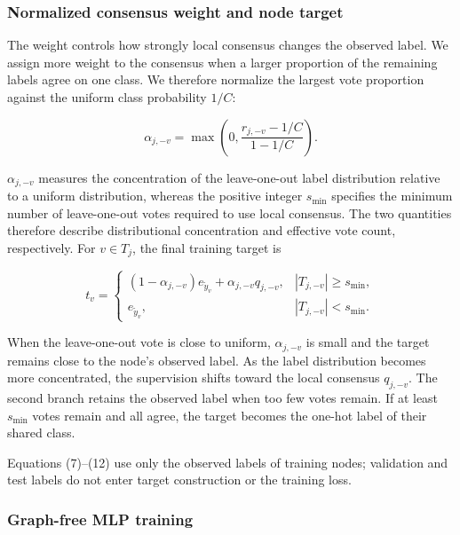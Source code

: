 \documentclass[preprint,12pt]{elsarticle}
\begin{document}
\subsubsection{Normalized consensus weight and node target}\label{sec:3.4.2}

The weight controls how strongly local consensus changes the observed label. We assign more weight to the consensus when a larger proportion of the remaining labels agree on one class. We therefore normalize the largest vote proportion against the uniform class probability \(1/C\):

\begin{equation}\label{eq:11}
\alpha_{j, - v} = \max\left( 0,\frac{r_{j, - v} - 1/C}{1 - 1/C} \right).
\end{equation}

\(\alpha_{j, - v}\) measures the concentration of the leave-one-out label distribution relative to a uniform distribution, whereas the positive integer \(s_{\min}\) specifies the minimum number of leave-one-out votes required to use local consensus. The two quantities therefore describe distributional concentration and effective vote count, respectively. For \(v \in T_{j}\), the final training target is

\begin{equation}\label{eq:12}
t_{v} = \begin{cases}
(1 - \alpha_{j, - v})e_{{\widetilde{y}}_{v}} + \alpha_{j, - v}q_{j, - v}, & |T_{j, - v}| \geq s_{\min}, \\
e_{{\widetilde{y}}_{v}}, & |T_{j, - v}| < s_{\min}.
\end{cases}
\end{equation}

When the leave-one-out vote is close to uniform, \(\alpha_{j, - v}\) is small and the target remains close to the node's observed label. As the label distribution becomes more concentrated, the supervision shifts toward the local consensus \(q_{j, - v}\). The second branch retains the observed label when too few votes remain. If at least \(s_{\min}\) votes remain and all agree, the target becomes the one-hot label of their shared class.

Equations (7)--(12) use only the observed labels of training nodes; validation and test labels do not enter target construction or the training loss.

\subsubsection{Graph-free MLP training}\label{sec:3.4.3}
\end{document}
